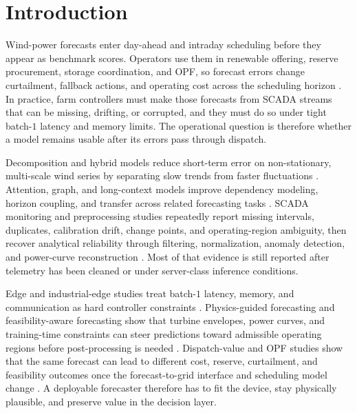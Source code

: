 ﻿\documentclass[review,1p,times]{elsarticle}
\begin{document}
\linenumbers

\section{Introduction}
\label{sec:intro}

Wind-power forecasts enter day-ahead and intraday scheduling before they appear as benchmark scores. Operators use them in renewable offering, reserve procurement, storage coordination, and OPF, so forecast errors change curtailment, fallback actions, and operating cost across the scheduling horizon \citep{khaloie2020coordinated,houben2023optimal,li2024opf_highren,yan2025economicvalue,masood2025economic}. In practice, farm controllers must make those forecasts from SCADA streams that can be missing, drifting, or corrupted, and they must do so under tight batch-$1$ latency and memory limits. The operational question is therefore whether a model remains usable after its errors pass through dispatch.

Decomposition and hybrid models reduce short-term error on non-stationary, multi-scale wind series by separating slow trends from faster fluctuations \citep{verdone2025review,zhang2021windreview,duan2025robust}. Attention, graph, and long-context models improve dependency modeling, horizon coupling, and transfer across related forecasting tasks \citep{zhu2025realtime,ma2022gcnwind,gao2025mmgpt,wu2024stellm}. SCADA monitoring and preprocessing studies repeatedly report missing intervals, duplicates, calibration drift, change points, and operating-region ambiguity, then recover analytical reliability through filtering, normalization, anomaly detection, and power-curve reconstruction \citep{maldonadocorrea2020slr,sheng2025annreview,yang2013condition,bangalore2018earlyfault,leahy2019dataquality,letzgus2020,renstrom2020autoencoder,vervlimmeren2025scalable,martincalzada2025optimized}. Most of that evidence is still reported after telemetry has been cleaned or under server-class inference conditions.

Edge and industrial-edge studies treat batch-$1$ latency, memory, and communication as hard controller constraints \citep{zhou2019edge,gooi2023edgeintelligence,mwangi2024sdniiotedge}. Physics-guided forecasting and feasibility-aware forecasting show that turbine envelopes, power curves, and training-time constraints can steer predictions toward admissible operating regions before post-processing is needed \citep{astolfi2015datamining,martincalzada2025optimized,liu2024physics,liao2024trust}. Dispatch-value and OPF studies show that the same forecast can lead to different cost, reserve, curtailment, and feasibility outcomes once the forecast-to-grid interface and scheduling model change \citep{wang2011wind,quan2015computational,li2024opf_highren,yan2025economicvalue,larrahondo2021acdcomp}. A deployable forecaster therefore has to fit the device, stay physically plausible, and preserve value in the decision layer.
\end{document}

